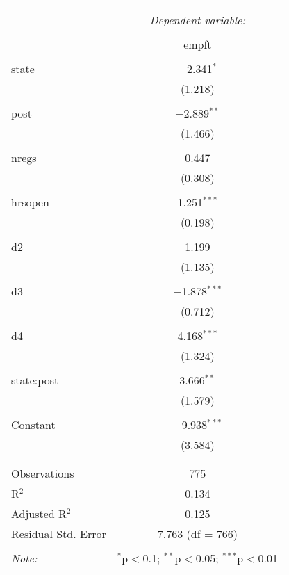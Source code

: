 
\begin{table}[!htbp] \centering 
  \caption{} 
  \label{} 
\begin{tabular}{@{\extracolsep{5pt}}lc} 
\\[-1.8ex]\hline 
\hline \\[-1.8ex] 
 & \multicolumn{1}{c}{\textit{Dependent variable:}} \\ 
\cline{2-2} 
\\[-1.8ex] & empft \\ 
\hline \\[-1.8ex] 
 state & $-$2.341$^{*}$ \\ 
  & (1.218) \\ 
  & \\ 
 post & $-$2.889$^{**}$ \\ 
  & (1.466) \\ 
  & \\ 
 nregs & 0.447 \\ 
  & (0.308) \\ 
  & \\ 
 hrsopen & 1.251$^{***}$ \\ 
  & (0.198) \\ 
  & \\ 
 d2 & 1.199 \\ 
  & (1.135) \\ 
  & \\ 
 d3 & $-$1.878$^{***}$ \\ 
  & (0.712) \\ 
  & \\ 
 d4 & 4.168$^{***}$ \\ 
  & (1.324) \\ 
  & \\ 
 state:post & 3.666$^{**}$ \\ 
  & (1.579) \\ 
  & \\ 
 Constant & $-$9.938$^{***}$ \\ 
  & (3.584) \\ 
  & \\ 
\hline \\[-1.8ex] 
Observations & 775 \\ 
R$^{2}$ & 0.134 \\ 
Adjusted R$^{2}$ & 0.125 \\ 
Residual Std. Error & 7.763 (df = 766) \\ 
\hline 
\hline \\[-1.8ex] 
\textit{Note:}  & \multicolumn{1}{r}{$^{*}$p$<$0.1; $^{**}$p$<$0.05; $^{***}$p$<$0.01} \\ 
\end{tabular} 
\end{table} 
